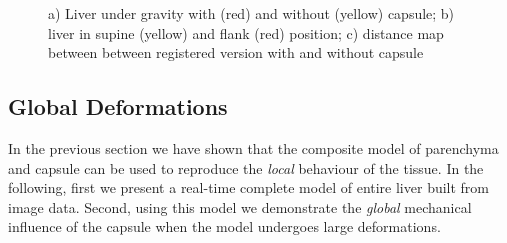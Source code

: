 \documentclass{llncs}
\begin{document}
\begin{figure}[t]
  \centering
    \caption{\label{f:global}%
    a) Liver under gravity with (red) and without (yellow) capsule;
    b) liver in supine (yellow) and flank (red) position;
    c) distance map between between registered version with and without
    capsule}
\end{figure}

\subsection{Global Deformations}
In the previous section we have shown that the composite model of parenchyma and 
capsule can be used to reproduce the \emph{local} behaviour of the tissue. In the following, 
first we present a real-time complete model of entire liver built from image data. 
Second, using this model we demonstrate the \emph{global} mechanical influence of the capsule when 
the model undergoes large deformations. 
\end{document}
